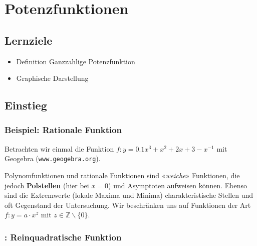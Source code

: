 \section{Potenzfunktionen}

\subsection*{Lernziele}

\begin{itemize}
\item Definition Ganzzahlige Potenzfunktion
\item Graphische Darstellung
\end{itemize}
\newpage


\subsection{Einstieg}

\subsubsection{Beispiel: Rationale Funktion}

Betrachten wir einmal die Funktion $f: y = 0.1x^3 + x^2 + 2x + 3 - x^{-1}$ \zB mit Geogebra (\texttt{www.geogebra.org}).



Polynomfunktionen und rationale Funktionen sind «\textit{weiche}» Funktionen, die jedoch \textbf{Polstellen} (hier bei $x=0$) und Asymptoten aufweisen können.
Ebenso sind die Extremwerte (lokale Maxima und Minima) charakteristische Stellen und oft Gegenstand der Untersuchung.
Wir beschränken uns auf Funktionen der Art $f: y=a\cdot{}x^z$
mit $z \in \mathbb{Z}\backslash\{0\}$.

\newpage
\subsubsection{: Reinquadratische Funktion}

